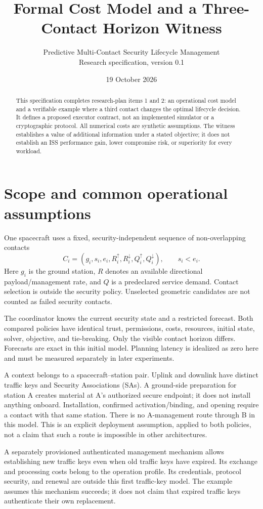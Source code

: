 \documentclass[11pt,a4paper]{article}
\title{Formal Cost Model and a Three-Contact Horizon Witness}
\author{Predictive Multi-Contact Security Lifecycle Management\\Research specification, version 0.1}
\date{19 October 2026}
\begin{document}
\maketitle
\begin{abstract}
This specification completes research-plan items 1 and 2: an operational cost model and a verifiable example where a third contact changes the optimal lifecycle decision. It defines a proposed executor contract, not an implemented simulator or a cryptographic protocol. All numerical costs are synthetic assumptions. The witness establishes a value of additional information under a stated objective; it does not establish an ISS performance gain, lower compromise risk, or superiority for every workload.
\end{abstract}

\section{Scope and common operational assumptions}
One spacecraft uses a fixed, security-independent sequence of non-overlapping contacts
\[
 C_i=(g_i,s_i,e_i,R_i^\uparrow,R_i^\downarrow,Q_i^\uparrow,Q_i^\downarrow),\qquad s_i<e_i.
\]
Here $g_i$ is the ground station, $R$ denotes an available directional payload/management rate, and $Q$ is a predeclared service demand. Contact selection is outside the security policy. Unselected geometric candidates are not counted as failed security contacts.

The coordinator knows the current security state and a restricted forecast. Both compared policies have identical trust, permissions, costs, resources, initial state, solver, objective, and tie-breaking. Only the visible contact horizon differs. Forecasts are exact in this initial model. Planning latency is idealized as zero here and must be measured separately in later experiments.

A context belongs to a spacecraft--station pair. Uplink and downlink have distinct traffic keys and Security Associations (SAs). A ground-side preparation for station A creates material at A's authorized secure endpoint; it does not install anything onboard. Installation, confirmed activation/binding, and opening require a contact with that same station. There is no A-management route through B in this model. This is an explicit deployment assumption, applied to both policies, not a claim that such a route is impossible in other architectures.

A separately provisioned authenticated management mechanism allows establishing new traffic keys even when old traffic keys have expired. Its exchange and processing costs belong to the operation profile. Its credentials, protocol security, and renewal are outside this first traffic-key model. The example assumes this mechanism succeeds; it does not claim that expired traffic keys authenticate their own replacement.
\end{document}
